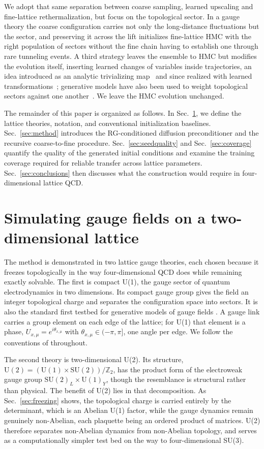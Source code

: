 \documentclass[prd, twocolumn, superscriptaddress, nofootinbib,floatfix]{revtex4-2}
\DeclareRobustCommand{\sect}[1]{Sec.~\ref{sec:#1}}
\begin{document}
We adopt that same separation between coarse sampling, learned upscaling and
fine-lattice rethermalization, but focus on the topological sector. In a gauge
theory the coarse configuration carries not only the long-distance fluctuations
but the sector, and preserving it across the lift initializes fine-lattice HMC
with the right population of sectors without the fine chain having to establish
one through rare tunneling events. A third strategy leaves the ensemble to HMC
but modifies the evolution itself, inserting learned changes of variables inside
trajectories, an idea introduced as an analytic trivializing
map~\cite{luscher2009} and since realized with learned
transformations~\cite{albandea2023,he2025}; generative models have also been
used to weight topological sectors against one another~\cite{singha2026}. We
leave the HMC evolution unchanged.

The remainder of this paper is organized as follows. In \sect{setup}, we define the lattice theories, notation, and conventional initialization
baselines. \sect{method} introduces the RG-conditioned diffusion preconditioner and the recursive coarse-to-fine procedure.
\sect{seedquality} and \sect{coverage} quantify the quality of the generated initial conditions and examine the training coverage required for
reliable transfer across lattice parameters. \sect{conclusions} then discusses what the construction
would require in four-dimensional lattice QCD.


\section{Simulating gauge fields on a two-dimensional lattice}
\label{sec:setup}

The method is demonstrated in two lattice gauge theories, each chosen because it
freezes topologically in the way four-dimensional QCD does while remaining
exactly solvable.
The first is compact U(1), the gauge sector of quantum electrodynamics in two
dimensions. Its compact gauge group gives the field an integer topological
charge and separates the configuration space into sectors. It is also the standard first
testbed for generative models of gauge fields \cite{kanwar2020,zhu2025}. A gauge link carries a group
element on each edge of the lattice; for U(1) that element is a phase,
$U_{x,\mu}=e^{i\theta_{x,\mu}}$ with $\theta_{x,\mu}\in(-\pi,\pi]$, one angle
per edge. We follow the conventions of \cite{gattringerlang2010} throughout.

The second theory is two-dimensional U(2). Its structure,
$\mathrm{U}(2)=(\mathrm{U}(1)\times \mathrm{SU}(2))/\mathbb{Z}_2$, has the
product form of the electroweak gauge group
$\mathrm{SU}(2)_L\times \mathrm{U}(1)_Y$, though the resemblance is structural
rather than physical. The benefit of U(2) lies in that decomposition. As
\sect{freezing} shows, the topological charge is carried entirely by the
determinant, which is an Abelian U(1) factor, while the gauge dynamics remain
genuinely non-Abelian, each plaquette being an ordered product of matrices.
U(2) therefore separates non-Abelian dynamics from non-Abelian topology, and
serves as a computationally simpler test bed on the way to four-dimensional
SU(3).
\end{document}
